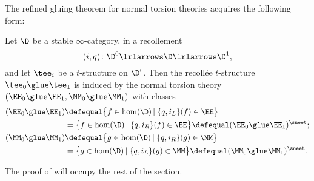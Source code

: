 The refined gluing theorem for normal torsion theories acquires the following form:
\begin{theorem}
\label{thm:trueglued}
Let $\D$ be a stable $\infty$\hyp{}category, in a recollement 
$$
(i,q)\colon \D^0 \lrlarrows  \D  \lrlarrows  \D^1,
$$
and let $\tee_i$ be a $t$\hyp{}structure on $\D^i$. Then the recoll\'ee $t$\hyp{}structure $\tee_0\glue \tee_1$ is induced by the normal torsion theory $(\EE_0\glue\EE_1,\MM_0\glue\MM_1)$ with classes
\begin{align*}
(\EE_0\glue \EE_1) & \defequal \big\{f\in\hom(\D)\left|\right. \{q, i_L\}(f)\in \EE \big\} \\
&= \big\{f\in\hom(\D)\left|\right. \{q, i_R\}(f)\in \EE \big\} \defequal (\EE_0\glue \EE_1)^\sneet; \\
(\MM_0\glue \MM_1) &\defequal \big\{g\in\hom(\D)\left|\right. \{q, i_R\}(g)\in \MM \big\}\\
&= \big\{g\in\hom(\D)\left|\right. \{q, i_L\}(g)\in \MM \big\} \defequal (\MM_0\glue \MM_1)^\sneet.
\end{align*}
\end{theorem}
The proof of  will occupy the rest of the section.
